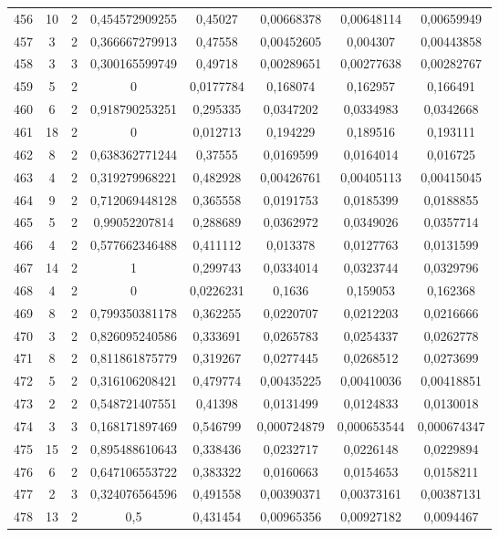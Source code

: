 \begin{longtable}{|c|c|c|c|c|c|c|c|}
456 & 10 & 2 & 0,454572909255 & 0,45027 & 0,00668378 & 0,00648114 & 0,00659949  \\
457 & 3 & 2 & 0,366667279913 & 0,47558 & 0,00452605 & 0,004307 & 0,00443858  \\
458 & 3 & 3 & 0,300165599749 & 0,49718 & 0,00289651 & 0,00277638 & 0,00282767  \\
459 & 5 & 2 & 0 & 0,0177784 & 0,168074 & 0,162957 & 0,166491  \\
460 & 6 & 2 & 0,918790253251 & 0,295335 & 0,0347202 & 0,0334983 & 0,0342668  \\
461 & 18 & 2 & 0 & 0,012713 & 0,194229 & 0,189516 & 0,193111  \\
462 & 8 & 2 & 0,638362771244 & 0,37555 & 0,0169599 & 0,0164014 & 0,016725  \\
463 & 4 & 2 & 0,319279968221 & 0,482928 & 0,00426761 & 0,00405113 & 0,00415045  \\
464 & 9 & 2 & 0,712069448128 & 0,365558 & 0,0191753 & 0,0185399 & 0,0188855  \\
465 & 5 & 2 & 0,99052207814 & 0,288689 & 0,0362972 & 0,0349026 & 0,0357714  \\
466 & 4 & 2 & 0,577662346488 & 0,411112 & 0,013378 & 0,0127763 & 0,0131599  \\
467 & 14 & 2 & 1 & 0,299743 & 0,0334014 & 0,0323744 & 0,0329796  \\
468 & 4 & 2 & 0 & 0,0226231 & 0,1636 & 0,159053 & 0,162368  \\
469 & 8 & 2 & 0,799350381178 & 0,362255 & 0,0220707 & 0,0212203 & 0,0216666  \\
470 & 3 & 2 & 0,826095240586 & 0,333691 & 0,0265783 & 0,0254337 & 0,0262778  \\
471 & 8 & 2 & 0,811861875779 & 0,319267 & 0,0277445 & 0,0268512 & 0,0273699  \\
472 & 5 & 2 & 0,316106208421 & 0,479774 & 0,00435225 & 0,00410036 & 0,00418851  \\
473 & 2 & 2 & 0,548721407551 & 0,41398 & 0,0131499 & 0,0124833 & 0,0130018  \\
474 & 3 & 3 & 0,168171897469 & 0,546799 & 0,000724879 & 0,000653544 & 0,000674347  \\
475 & 15 & 2 & 0,895488610643 & 0,338436 & 0,0232717 & 0,0226148 & 0,0229894  \\
476 & 6 & 2 & 0,647106553722 & 0,383322 & 0,0160663 & 0,0154653 & 0,0158211  \\
477 & 2 & 3 & 0,324076564596 & 0,491558 & 0,00390371 & 0,00373161 & 0,00387131  \\
478 & 13 & 2 & 0,5 & 0,431454 & 0,00965356 & 0,00927182 & 0,0094467  \\

\end{longtable}
